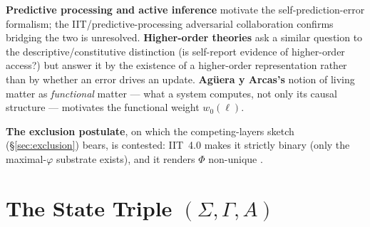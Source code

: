 \documentclass[11pt]{article}
\begin{document}
\textbf{Predictive processing and active inference} \cite{friston2010,deane2021} motivate the self-prediction-error formalism; the IIT/predictive-processing adversarial collaboration \cite{intrepid2026} confirms bridging the two is unresolved. \textbf{Higher-order theories} \cite{rosenthal2005} ask a similar question to the descriptive/constitutive distinction (is self-report evidence of higher-order access?) but answer it by the existence of a higher-order representation rather than by whether an error drives an update. \textbf{Ag\"uera y Arcas's} notion of living matter as \emph{functional} matter --- what a system computes, not only its causal structure --- motivates the functional weight $w_0(\ell)$.

\textbf{The exclusion postulate}, on which the competing-layers sketch (\S\ref{sec:exclusion}) bears, is contested: IIT~4.0 \cite{albantakis2023} makes it strictly binary (only the maximal-$\varphi$ substrate exists), and it renders $\Phi$ non-unique \cite{hanson2023}.

\section{The State Triple $(\Sigma,\Gamma,A)$}
\end{document}
